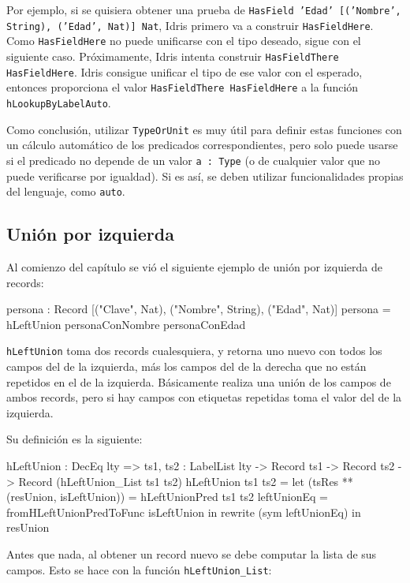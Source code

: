 Por ejemplo, si se quisiera obtener una prueba de \texttt{HasField 'Edad' [('Nombre', String), ('Edad', Nat)] Nat}, Idris primero va a construir \texttt{HasFieldHere}. Como \texttt{HasFieldHere} no puede unificarse con el tipo deseado, sigue con el siguiente caso. Próximamente, Idris intenta construir \texttt{HasFieldThere HasFieldHere}. Idris consigue unificar el tipo de ese valor con el esperado, entonces proporciona el valor \texttt{HasFieldThere HasFieldHere} a la función \texttt{hLookupByLabelAuto}.

Como conclusión, utilizar \texttt{TypeOrUnit} es muy útil para definir estas funciones con un cálculo automático de los predicados correspondientes, pero solo puede usarse si el predicado no depende de un valor \texttt{a : Type} (o de cualquier valor que no puede verificarse por igualdad). Si es así, se deben utilizar funcionalidades propias del lenguaje, como \texttt{auto}.

\subsection{Unión por izquierda}

Al comienzo del capítulo se vió el siguiente ejemplo de unión por izquierda de records:

\begin{code}
persona : Record [("Clave", Nat), ("Nombre", String),
  ("Edad", Nat)]
persona = hLeftUnion personaConNombre personaConEdad
\end{code}

\texttt{hLeftUnion} toma dos records cualesquiera, y retorna uno nuevo con todos los campos del de la izquierda, más los campos del de la derecha que no están repetidos en el de la izquierda. Básicamente realiza una unión de los campos de ambos records, pero si hay campos con etiquetas repetidas toma el valor del de la izquierda.

Su definición es la siguiente:

\begin{code}
hLeftUnion : DecEq lty => {ts1, ts2 : LabelList lty} ->
  Record ts1 -> Record ts2 -> Record (hLeftUnion_List ts1 ts2)
hLeftUnion ts1 ts2 =
  let (tsRes ** (resUnion, isLeftUnion)) =
      hLeftUnionPred ts1 ts2
    leftUnionEq = fromHLeftUnionPredToFunc isLeftUnion
  in rewrite (sym leftUnionEq) in resUnion
\end{code}

Antes que nada, al obtener un record nuevo se debe computar la lista de sus campos. Esto se hace con la función \texttt{hLeftUnion\_List}:


